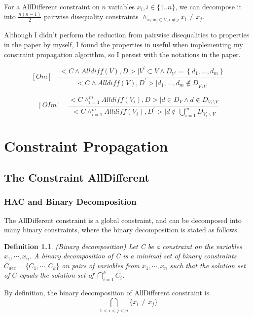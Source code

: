 \documentclass[a4paper, 12pt]{report}
\newtheorem{definition}{Definition}[subsection]
\begin{document}
            For a AllDifferent constraint on $n$ variables $x_i, i\in \{1..n\}$, we can decompose it into $\frac{n(n-1)}{2}$ pairwise disequality constraints $\land_{x_i,x_j\in V, i\neq j} x_i\neq x_j$.

            Although I didn't perform the reduction from pairwise disequalities to properties in the paper by myself, I found the properties in \cite{lardeux2008overlapping} useful when implementing my constraint propagation algorithm, so I persist with the notations in the paper\cite{lardeux2008overlapping}.

            $$[Om] \quad \frac{<C \wedge Alldiff(V), D>| V^{\prime} \subset V \wedge D_{V^{\prime}}=\left\{d_{1}, \ldots, d_{m}\right\}}{<C \wedge Alldiff(V), D^{\prime}>| d_{1}, \ldots, d_{m} \notin D_{V \setminus V^{\prime}}}$$

            $$[OIm] \quad \frac{<C \wedge_{i=1}^{m} Alldiff(V_{i}), D>| d \in D_{V} \wedge d \notin D_{V_{1} \setminus V}}{<C \wedge_{i=1}^{m} Alldiff(V_{i}), D^{\prime}>| d \notin \bigcup_{i=1}^{m} D_{V_{i} \backslash V}}$$



\chapter {Constraint Propagation}


    \section {The Constraint AllDifferent}

        \subsection {HAC and Binary Decomposition}
            
            The AllDifferent constraint is a global constraint, and can be decomposed into many binary constraints, where the binary decomposition is stated as follows.

            \begin{definition}
                (Binary decomposition\cite{van2001alldifferent}) Let C be a constraint on the variables $x_1,\cdots,x_n$. A binary decomposition of C is a minimal set of binary constraints $C_{dec}=\{C_1,\cdots,C_k\}$ on pairs of variables from $x_1, \cdots, x_n$ such that the solution set of $C$ equals the solution set of $\bigcap_{i=1}^k C_i$.
            \end{definition}
            By definition, the binary decomposition of AllDifferent constraint is $$\bigcap_{1<i<j<n} \{x_i\neq x_j\} $$
\end{document}
